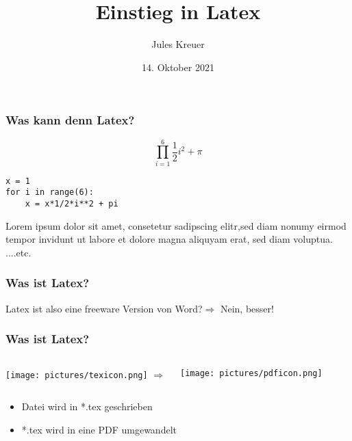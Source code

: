 \documentclass{beamer}
\title[]{Einstieg in Latex} %
\author{Jules Kreuer} %
\institute[FSI] %
{
	FSI Uni Tübingen\\
	aufbauend auf den Workshop von Adreas Rist 2019\\ %
	\medskip
	\textit{fsi@fsi.uni-tuebingen.de}\\
}
\date{14. Oktober 2021} %
\begin{document}
\begin{frame}
\titlepage %
\end{frame}





\begin{frame}[fragile]
\frametitle{Was kann denn Latex?}
\[
\prod^6_{i=1} \frac{1}{2}i^2 + \pi
\]
\begin{verbatim}
x = 1
for i in range(6):
	x = x*1/2*i**2 + pi
\end{verbatim}
Lorem ipsum dolor sit amet, consetetur sadipscing elitr,sed diam nonumy eirmod tempor invidunt ut labore et dolore magna aliquyam erat, sed diam voluptua.\\
....etc.
\end{frame}

\begin{frame}
\frametitle{Was ist Latex?}
     Latex ist also eine freeware Version von Word?\pause $\Rightarrow$ Nein, besser!
     
\end{frame}


\begin{frame}
     \frametitle{Was ist Latex?}
     \begin{columns}[c] %
          
     \texttt{[image: pictures/texicon.png]}
     \Huge{$ \Rightarrow $}
          
     \texttt{[image: pictures/pdficon.png]}
          
     \end{columns}
\begin{itemize}[<+->]
     \item Datei wird in *.tex geschrieben
     \item *.tex wird in eine PDF umgewandelt
\end{itemize}
\end{frame}
\end{document}
